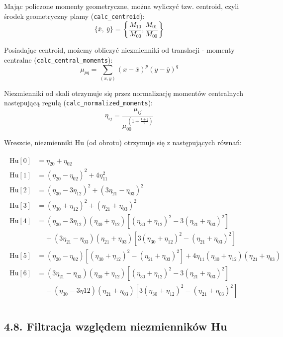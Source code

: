 \documentclass[11pt,a4paper,twoside]{report}
\begin{document}
			Mając policzone momenty geometryczne, można wyliczyć tzw. centroid, czyli środek geometryczny plamy (\texttt{calc\_centroid}):
			\[
				\{\overline{x},~\overline{y}\} = \left\{ \frac{M_{10}}{M_{00}}, \frac{M_{01}}{M_{00}} \right\}
			\]

			Posiadając centroid, możemy obliczyć niezmienniki od translacji - momenty centralne (\texttt{calc\_central\_moments}):
			\[
				\mu_{pq} = \sum_{(x,y)} (x - \overline{x})^p (y - \overline{y})^q
			\]

			Niezmienniki od skali otrzymuje się przez normalizację momentów centralnych następującą regułą (\texttt{calc\_normalized\_moments}):
			\[
				\eta_{ij} = \frac{\mu_{ij}}{\mu_{00}^{~\left(1 + \frac{1+j}{2}\right)}}
			\]

			Wreszcie, niezmienniki Hu (od obrotu) otrzymuje się z następujących równań:

			\begin{align}
			\begin{split}
			   \text{Hu}[0] &= \eta_{20} + \eta_{02} \\
			   \text{Hu}[1] &= (\eta_{20} - \eta_{02})^2  + 4\eta_{11}^2 \\
			   \text{Hu}[2] &= (\eta_{30} - 3\eta_{12})^2 + (3\eta_{21} - \eta_{03})^2 \\
			   \text{Hu}[3] &= (\eta_{30} + \eta_{12})^2  + (\eta_{21} + \eta_{03})^2 \\
			   \text{Hu}[4] &= (\eta_{30} - 3\eta_{12}) (\eta_{30} + \eta_{12})[ (\eta_{30} + \eta_{12})^2 - 3 (\eta_{21} + \eta_{03})^2] \\			&~~~~~+ (3 \eta_{21} - \eta_{03}) (\eta_{21} + \eta_{03})[ 3(\eta_{30} + \eta_{12})^2 -  (\eta_{21} + \eta_{03})^2] \\
			   \text{Hu}[5] &=  (\eta_{20} - \eta_{02})[(\eta_{30} + \eta_{12})^2 - (\eta_{21} + \eta_{03})^2] + 4\eta_{11}(\eta_{30} + \eta_{12})(\eta_{21} + \eta_{03}) \\
			   \text{Hu}[6] &= (3 \eta_{21} - \eta_{03})(\eta_{30} + \eta_{12})[(\eta_{30} + \eta_{12})^2 - 3(\eta_{21} + \eta_{03})^2] \\
			   	   &~~~~~- (\eta_{30} - 3\eta {12})(\eta_{21} + \eta_{03})[3(\eta_{30} + \eta_{12})^2 - (\eta_{21} + \eta_{03})^2] \\
   			\end{split}
			\end{align}

	\subsection*{4.8. Filtracja względem niezmienników Hu}
\end{document}
